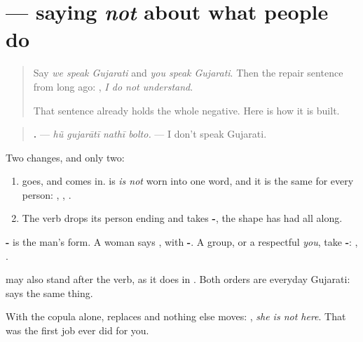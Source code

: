 \section[\texorpdfstring{\gu{નથી} …\gu{તો} (nathī …-to)}{નથી …તો (nathī …-to)}]{   — saying \emph{not} about what people do}

\label{lesson:GU-C145-nathi-bolto}



\begin{quote}
Say \emph{we speak Gujarati} and \emph{you speak Gujarati}. Then the repair sentence from long ago: \textbf{ }, \emph{I do not understand}.

That sentence already holds the whole negative. Here is how it is built.
\end{quote}

\begin{grammarlens}[title={Grammar Lens: \gu{નથી} takes the copula's place}]
\begin{quote}
\textbf{   .} — \emph{hũ gujarātī nathī bolto.} — I don't speak Gujarati.
\end{quote}

Two changes, and only two:

\begin{enumerate}
\raggedright
  \item \textbf{} goes, and \textbf{} comes in. \textbf{} is \emph{is not} worn into one word, and it is the same for every person: \textbf{ }, \textbf{ }, \textbf{ }.
  \item The verb drops its person ending and takes \textbf{-}, the shape \textbf{} has had all along.
\end{enumerate}

\textbf{-} is the man's form. A woman says \textbf{   }, with \textbf{-}. A group, or a respectful \emph{you}, take \textbf{-}: \textbf{  }, \textbf{  }.

\textbf{} may also stand after the verb, as it does in \textbf{ }. Both orders are everyday Gujarati: \textbf{   } says the same thing.
\end{grammarlens}

\begin{grammarlens}[title={Grammar Lens: when there is no other verb}]
With the copula alone, \textbf{} replaces \textbf{} and nothing else moves: \textbf{  }, \emph{she is not here}. That was the first job \textbf{} ever did for you.
\end{grammarlens}

